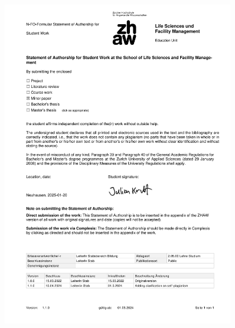\thispagestyle{empty}
\begin{figure}[h!]
    \centering
    \includegraphics[width=0.9\textwidth]{figures/declaration_independence.pdf}
\end{figure}
\restoregeometry %
